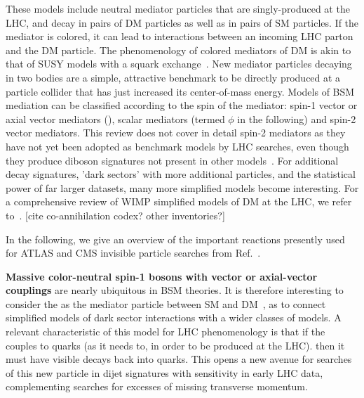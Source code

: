 These models include neutral mediator particles that are singly-produced at the LHC, and decay in pairs of DM particles as well as in pairs of SM particles. If the mediator is colored, it can lead to interactions between an incoming LHC parton and the DM particle. The phenomenology of colored mediators of DM is akin to that of SUSY models with a squark exchange~\cite{Papucci:2014iwa,An:2013xka,Bell:2012rg}. New mediator particles decaying in two bodies
are a simple, attractive benchmark to be directly produced at a particle collider that has just increased its center-of-mass energy. Models of BSM mediation can be classified according to the spin of the mediator: spin-1 vector or axial vector mediators (\Zprime), scalar mediators (termed $\phi$ in the following) and spin-2 vector mediators. This review does not cover in detail spin-2 mediators as they have not yet been adopted as benchmark models by LHC searches, even though they produce diboson signatures not present in other models~\cite{Kraml:2017atm,Han:2015cty}. For additional decay signatures, 'dark sectors' with more additional particles, and the statistical power of far larger datasets, many more simplified models become interesting. For a comprehensive review of WIMP simplified models of DM at the LHC, we refer to~\cite{Arcadi:2017kky}. [cite co-annihilation codex? other inventories?]

In the following, we give an overview of the important reactions presently used for ATLAS and CMS invisible particle searches from Ref.~\cite{Abercrombie:2015wmb}.

\textbf{Massive color-neutral spin-1 bosons with vector or axial-vector couplings} are nearly ubiquitous in BSM theories. 
It is therefore interesting to consider the \Zprime as the mediator particle between SM and DM~\cite{Shoemaker:2011vi},
as to connect simplified models of dark sector interactions with a wider classes of models.
A relevant characteristic of this model for LHC phenomenology is that if the \Zprime couples to quarks (as it needs to, in order to be produced at the LHC). 
then it must have visible decays back into quarks. This opens a new avenue for searches of this new
particle in dijet signatures with sensitivity in early LHC data, complementing searches for excesses
of missing transverse momentum. 

